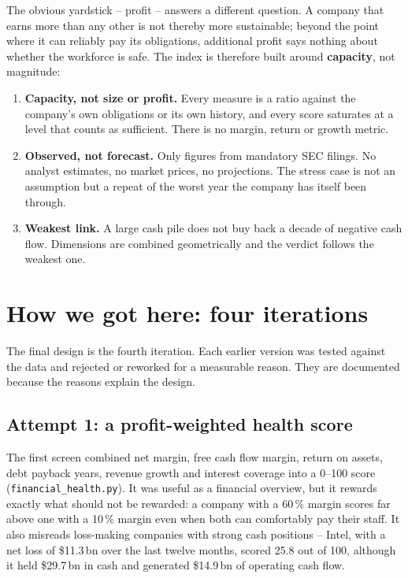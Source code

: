 \documentclass[11pt,a4paper]{article}
\newcommand{\code}[1]{\texttt{\small #1}}
\begin{document}
The obvious yardstick -- profit -- answers a different question. A company that earns more than any other is not thereby more sustainable; beyond the point where it can reliably pay its obligations, additional profit says nothing about whether the workforce is safe. The index is therefore built around \textbf{capacity}, not magnitude:

\begin{enumerate}
  \item \textbf{Capacity, not size or profit.} Every measure is a ratio against the company's own obligations or its own history, and every score saturates at a level that counts as sufficient. There is no margin, return or growth metric.
  \item \textbf{Observed, not forecast.} Only figures from mandatory SEC filings. No analyst estimates, no market prices, no projections. The stress case is not an assumption but a repeat of the worst year the company has itself been through.
  \item \textbf{Weakest link.} A large cash pile does not buy back a decade of negative cash flow. Dimensions are combined geometrically and the verdict follows the weakest one.
\end{enumerate}

\section{How we got here: four iterations}

The final design is the fourth iteration. Each earlier version was tested against the data and rejected or reworked for a measurable reason. They are documented because the reasons explain the design.

\subsection{Attempt 1: a profit-weighted health score}
The first screen combined net margin, free cash flow margin, return on assets, debt payback years, revenue growth and interest coverage into a 0--100 score (\code{financial\_health.py}). It was useful as a financial overview, but it rewards exactly what should not be rewarded: a company with a 60\,\% margin scores far above one with a 10\,\% margin even when both can comfortably pay their staff. It also misreads loss-making companies with strong cash positions -- Intel, with a net loss of \$11.3\,bn over the last twelve months, scored 25.8 out of 100, although it held \$29.7\,bn in cash and generated \$14.9\,bn of operating cash flow.
\end{document}
